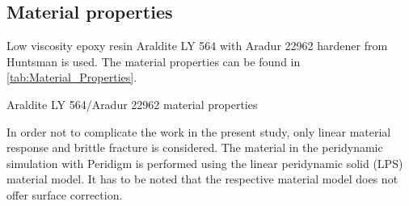 \subsection{Material properties}

Low viscosity epoxy resin Araldite LY 564 with Aradur 22962 hardener from Huntsman \cite{HuntsmanLY564DataSheet2009} is used. The material properties can be found in \autoref{tab:Material_Properties}.

\begin{table}[!htb]

\caption{Araldite LY 564/Aradur 22962 material properties}
\label{tab:Material_Properties}
\end{table}

In order not to complicate the work in the present study, only linear material response and brittle fracture is considered. The material in the peridynamic simulation with Peridigm is performed using the linear peridynamic solid (LPS) material model. It has to be noted that the respective material model does not offer surface correction.